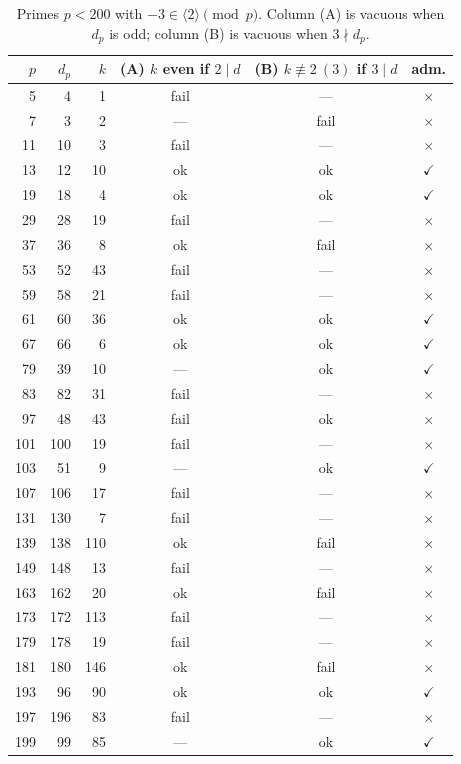 \documentclass[11pt,reqno]{amsart}
\theoremstyle{plain}
\theoremstyle{definition}
\theoremstyle{remark}
\newcommand{\gen}[1]{\langle #1 \rangle}
\begin{document}
\begin{table}[t]
\centering
\small
\begin{tabular}{rrrccc}
\toprule
$p$ & $d_{p}$ & $k$ & (A) $k$ even if $2\mid d$ & (B) $k\not\equiv 2\ (3)$ if $3\mid d$ & adm. \\
\midrule
5   & 4  & 1  & fail & ---  & $\times$ \\
7   & 3  & 2  & ---  & fail & $\times$ \\
11  & 10 & 3  & fail & ---  & $\times$ \\
13  & 12 & 10 & ok   & ok   & $\checkmark$ \\
19  & 18 & 4  & ok   & ok   & $\checkmark$ \\
29  & 28 & 19 & fail & ---  & $\times$ \\
37  & 36 & 8  & ok   & fail & $\times$ \\
53  & 52 & 43 & fail & ---  & $\times$ \\
59  & 58 & 21 & fail & ---  & $\times$ \\
61  & 60 & 36 & ok   & ok   & $\checkmark$ \\
67  & 66 & 6  & ok   & ok   & $\checkmark$ \\
79  & 39 & 10 & ---  & ok   & $\checkmark$ \\
83  & 82 & 31 & fail & ---  & $\times$ \\
97  & 48 & 43 & fail & ok   & $\times$ \\
101 & 100& 19 & fail & ---  & $\times$ \\
103 & 51 & 9  & ---  & ok   & $\checkmark$ \\
107 & 106& 17 & fail & ---  & $\times$ \\
131 & 130& 7  & fail & ---  & $\times$ \\
139 & 138& 110& ok   & fail & $\times$ \\
149 & 148& 13 & fail & ---  & $\times$ \\
163 & 162& 20 & ok   & fail & $\times$ \\
173 & 172& 113& fail & ---  & $\times$ \\
179 & 178& 19 & fail & ---  & $\times$ \\
181 & 180& 146& ok   & fail & $\times$ \\
193 & 96 & 90 & ok   & ok   & $\checkmark$ \\
197 & 196& 83 & fail & ---  & $\times$ \\
199 & 99 & 85 & ---  & ok   & $\checkmark$ \\
\bottomrule
\end{tabular}
\caption{Primes $p<200$ with $-3\in\gen{2}\pmod p$. Column (A) is vacuous when $d_{p}$ is odd;
column (B) is vacuous when $3\nmid d_{p}$.}
\label{tab:sieve}
\end{table}
\end{document}
